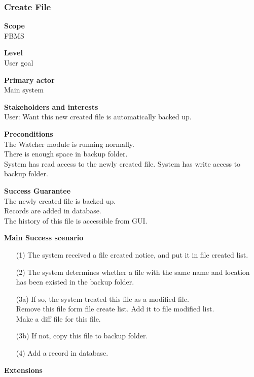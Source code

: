 \documentclass[12pt,a4paper]{article}
\begin{document}
\subsubsection{Create File}
\begin{description}
	\item \textbf{Scope} \\
		FBMS
	\item \textbf{Level} \\
		User goal
	\item \textbf{Primary actor} \\
		Main system
	\item \textbf{Stakeholders and interests} \\
		User: Want this new created file is automatically backed up.
	\item \textbf{Preconditions} \\
		The Watcher module is running normally.\\
		There is enough space in backup folder.\\
		System has read access to the newly created file.
		System has write access to backup folder.
	\item \textbf{Success Guarantee} \\
		The newly created file is backed up.\\
		Records are added in database.\\
		The history of this file is accessible from GUI.
	\item \textbf{Main Success scenario} \vspace{-4ex} \\
	\begin{itemize}
		\item[(1)] The system received a file created notice, and put it in file created list.
		\item[(2)] The system determines whether a file with the same name and location has been existed in the backup folder.
		\item[(3a)] If so, the system treated this file as a modified file.\\
					Remove this file form file create list. Add it to file modified list.\\
					Make a diff file for this file.
		\item[(3b)] If not, copy this file to backup folder.
		\item[(4)] Add a record in database.
	\end{itemize}
	\item \textbf{Extensions} \\

\end{description}
\end{document}
